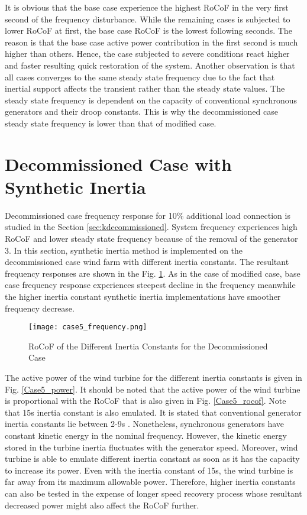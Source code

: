 It is obvious that the base case experience the highest RoCoF in the very first second of the frequency disturbance. While the remaining cases is subjected to lower RoCoF at first, the base case RoCoF is the lowest following seconds. The reason is that the base case active power contribution in the first second is much higher than others. Hence, the case subjected to severe conditions react higher and faster resulting quick restoration of the system. Another observation is that all cases converges to the same steady state frequency due to the fact that inertial support affects the transient rather than the steady state values. The steady state frequency is dependent on the capacity of conventional synchronous generators and their droop constants. This is why the decommissioned case steady state frequency is lower than that of modified case.
\section{Decommissioned Case with Synthetic Inertia}
Decommissioned case frequency response for 10\% additional load connection is studied in the Section \ref{sec:kdecommissioned}. System frequency experiences high RoCoF and lower steady state frequency because of the removal of the generator 3. In this section, synthetic inertia method  is implemented on the decommissioned case wind farm with different inertia constants. The resultant frequency responses are shown in the Fig. \ref{Case5_freq}. As in the case of modified case, base case frequency response experiences steepest decline in the frequency meanwhile the higher inertia constant synthetic inertia implementations have smoother frequency decrease.\par
\begin{figure}[h]
	\centering
	\texttt{[image: case5\_frequency.png]}
	\caption{RoCoF of the Different Inertia Constants for the Decommissioned Case}
	\label{Case5_freq}
\end{figure}
The active power of the wind turbine for the different inertia constants is given in Fig. \ref{Case5_power}. It should be noted that the active power of the wind turbine is proportional with the RoCoF that is also given in Fig. \ref{Case5_rocof}. Note that 15s inertia constant is also emulated. It is stated that conventional generator inertia constants lie between 2-9s \cite{Kundur}. Nonetheless, synchronous generators have constant kinetic energy in the nominal frequency. However, the kinetic energy stored in the turbine inertia fluctuates with the generator speed. Moreover, wind turbine is able to emulate different inertia constant as soon as it has the capacity to increase its power. Even with the inertia constant of 15s, the wind turbine is far away from its maximum allowable power. Therefore, higher inertia constants can also be tested in the expense of longer speed recovery process whose resultant decreased power might also affect the RoCoF further. 
